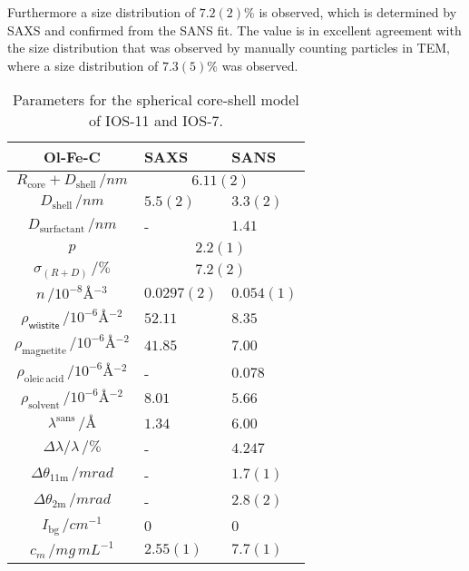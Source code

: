 \documentclass[\main/dresen_thesis.tex]{subfiles}
\begin{document}
  Furthermore a size distribution of $7.2(2) \%$ is observed, which is determined by SAXS and confirmed from the SANS fit.
  The value is in excellent agreement with the size distribution that was observed by manually counting particles in TEM, where a size distribution of $7.3(5) \%$ was observed.


  \begin{table}[!htbp]
    \centering
    \caption{\label{tab:colloidalCrystals:nanoparticle:sas}Parameters for the spherical core-shell model of IOS-11 and IOS-7.}
    \begin{tabular}{ c | l | l}
      \rule{0pt}{2ex} \textbf{Ol-Fe-C} & \textbf{SAXS} & \textbf{SANS}\\
      \hline
      \rule{0pt}{2ex} $R_\mathrm{core} + D_\mathrm{shell} \, / \unit{nm}$ & \multicolumn{2}{c}{$6.11(2)$} \\
      \rule{0pt}{2ex} $D_\mathrm{shell}\, / \unit{nm}$                    & $5.5(2)$    & $3.3(2)$       \\
      \rule{0pt}{2ex} $D_\mathrm{surfactant}\, / \unit{nm}$               & -           & $1.41$         \\
      \rule{0pt}{2ex} $p $                                                & \multicolumn{2}{c}{$2.2(1)$} \\
      \rule{0pt}{2ex} $\sigma_{(R+D)}\, / \unit{\%}$                      & \multicolumn{2}{c}{$7.2(2)$} \\
      \rule{0pt}{2ex} $n \, / \unit{10^{-8} \angstrom^{-3}}$              & $0.0297(2)$  &  $0.054(1)$ \\
      \hline
      \rule{0pt}{2ex} $\rho_\textsf{w\"ustite} \, / \unit{10^{-6} \angstrom^{-2}}$    & $52.11$ & $8.35$\\
      \rule{0pt}{2ex} $\rho_\mathrm{magnetite} \, / \unit{10^{-6} \angstrom^{-2}}$    & $41.85$ & $7.00$\\
      \rule{0pt}{2ex} $\rho_\mathrm{oleic\, acid} \, / \unit{10^{-6} \angstrom^{-2}}$ & -       & $0.078$\\
      \rule{0pt}{2ex} $\rho_\mathrm{solvent} \, / \unit{10^{-6} \angstrom^{-2}}$      & $8.01$  & $5.66$\\
      \hline
      \rule{0pt}{2ex} $\lambda^\mathrm{sans} \, / \unit{\unit{\angstrom}}$            & $1.34$  & $6.00$\\
      \rule{0pt}{2ex} $\Delta \lambda / \lambda \, / \unit{\%}$                       & -       & $4.247$\\
      \rule{0pt}{2ex} $\Delta \theta_\mathrm{11 m} \, / \unit{mrad}$                  & -       & $1.7(1)$\\
      \rule{0pt}{2ex} $\Delta \theta_\mathrm{2 m} \, / \unit{mrad}$                   & -       & $2.8(2)$\\
      \rule{0pt}{2ex} $I_\mathrm{bg} \, / \unit{cm^{-1}}$                             & $0$     & $0$\\
      \hline
      \rule{0pt}{2ex} $c_m \, / \unit{mg\, mL^{-1}}$                                  & $2.55(1)$ & $7.7(1)$\\
      \hline
    \end{tabular}
  \end{table}
\end{document}

